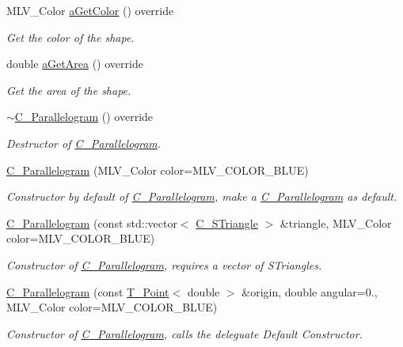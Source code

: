\begin{DoxyCompactItemize}
M\+L\+V\+\_\+\+Color \hyperlink{classC__Parallelogram_afd5055e948fcd992be3cdd227c8b4bfb}{a\+Get\+Color} () override
\begin{DoxyCompactList}\small\item\em Get the color of the shape. \end{DoxyCompactList}\item 
double \hyperlink{classC__Parallelogram_a72b4509a33ee27331e5b9bdc8a3278e8}{a\+Get\+Area} () override
\begin{DoxyCompactList}\small\item\em Get the area of the shape. \end{DoxyCompactList}\item 
\hyperlink{classC__Parallelogram_a2d7af48f3a26e8e07031e7c147a084a3}{$\sim$\+C\+\_\+\+Parallelogram} () override
\begin{DoxyCompactList}\small\item\em Destructor of \hyperlink{classC__Parallelogram}{C\+\_\+\+Parallelogram}. \end{DoxyCompactList}\item 
\hyperlink{classC__Parallelogram_a85d543d3a3a118676e7e47cff7ce82be}{C\+\_\+\+Parallelogram} (M\+L\+V\+\_\+\+Color color=M\+L\+V\+\_\+\+C\+O\+L\+O\+R\+\_\+\+B\+L\+UE)
\begin{DoxyCompactList}\small\item\em Constructor by default of \hyperlink{classC__Parallelogram}{C\+\_\+\+Parallelogram}, make a \hyperlink{classC__Parallelogram}{C\+\_\+\+Parallelogram} as default. \end{DoxyCompactList}\item 
\hyperlink{classC__Parallelogram_a6e31f5dcaf076ca4b745c0b0108bb809}{C\+\_\+\+Parallelogram} (const std\+::vector$<$ \hyperlink{classC__STriangle}{C\+\_\+\+S\+Triangle} $>$ \&triangle, M\+L\+V\+\_\+\+Color color=M\+L\+V\+\_\+\+C\+O\+L\+O\+R\+\_\+\+B\+L\+UE)
\begin{DoxyCompactList}\small\item\em Constructor of \hyperlink{classC__Parallelogram}{C\+\_\+\+Parallelogram}, requires a vector of S\+Triangles. \end{DoxyCompactList}\item 
\hyperlink{classC__Parallelogram_abd470868efc5d3a002509a9e45e4ed63}{C\+\_\+\+Parallelogram} (const \hyperlink{classT__Point}{T\+\_\+\+Point}$<$ double $>$ \&origin, double angular=0., M\+L\+V\+\_\+\+Color color=M\+L\+V\+\_\+\+C\+O\+L\+O\+R\+\_\+\+B\+L\+UE)
\begin{DoxyCompactList}\small\item\em Constructor of \hyperlink{classC__Parallelogram}{C\+\_\+\+Parallelogram}, calls the deleguate Default Constructor. \end{DoxyCompactList}\item 

\end{DoxyCompactItemize}

